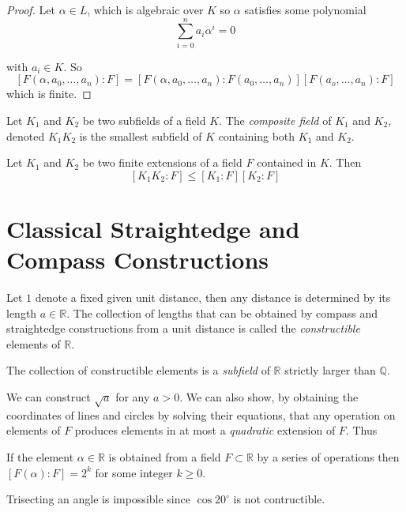 \documentclass[a4paper]{article}
\begin{document}
\begin{proof}
  Let $\alpha\in L$, which is algebraic over $K$ so $\alpha$ satisfies some polynomial
  \[
    \sum_{i=0}^{n} a_i \alpha^i = 0
  \]

  with $a_i\in K$. So
  \[
    [F(\alpha,a_0,\ldots,a_n):F] = [F(\alpha,a_0,\ldots,a_n):F(a_0,\ldots,a_n)][F(a_o,\ldots,a_n):F]
  \]
  which is finite.
\end{proof}

\begin{definition}
  Let $K_1$ and $K_2$ be two subfields of a field $K$. The \emph{composite field} of $K_1$ and $K_2$, denoted $K_1K_2$ is the smallest subfield of $K$ containing both $K_1$ and $K_2$.
\end{definition}

\begin{proposition}\label{prop:composite}
  Let $K_1$ and $K_2$ be two finite extensions of a field $F$ contained in $K$. Then
  \[
    [K_1K_2:F] \leq [K_1:F][K_2:F]
  \]
\end{proposition}

\section{Classical Straightedge and Compass Constructions}

Let $1$ denote a fixed given unit distance, then any distance is determined by its length $a\in \mathbb{R}$. The collection of lengths that can be obtained by compass and straightedge constructions from a unit distance is called the \emph{constructible} elements of $\mathbb{R}$.

\begin{proposition}
  The collection of constructible elements is a \emph{subfield} of $\mathbb{R}$ strictly larger than $\mathbb{Q}$.
\end{proposition}

We can construct $\sqrt a$ for any $a > 0$. We can also show, by obtaining the coordinates of lines and circles by solving their equations, that any operation on elements of $F$ produces elements in at most a \emph{quadratic} extension of $F$. Thus

\begin{proposition}
  If the element $\alpha\in\mathbb{R}$ is obtained from a field $F \subset \mathbb{R}$ by a series of operations then $[F(\alpha):F]=2^k$ for some integer $k \geq 0$.
\end{proposition}

\begin{proposition}
  Trisecting an angle is impossible since $\cos 20^{\circ}$ is not contructible.
\end{proposition}
\end{document}
